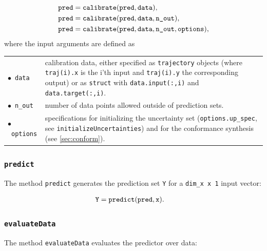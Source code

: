 \begin{equation*}
	\begin{split}
		&\texttt{pred} = {\normalfont \texttt{calibrate}}(\texttt{pred},\texttt{data}), \\
		&\texttt{pred} = {\normalfont \texttt{calibrate}}(\texttt{pred},\texttt{data},\texttt{n\_out}), \\
		&\texttt{pred} = {\normalfont \texttt{calibrate}}(\texttt{pred},\texttt{data},\texttt{n\_out},\texttt{options}), 
	\end{split}
\end{equation*}
where the input arguments are defined as
\begin{center}
	\renewcommand{\arraystretch}{1.3}
	\begin{tabular}[t]{l p{13cm} }
		$\bullet$~\texttt{data} & calibration data, either specified as \texttt{trajectory} objects (where \texttt{traj(i).x} is the i'th input and \texttt{traj(i).y} the corresponding output) or as \texttt{struct} with \texttt{data.input(:,i)} and \texttt{data.target(:,i)}.\\
		$\bullet$~\texttt{n\_out} & number of data points allowed outside of prediction sets.\\
		$\bullet$~\texttt{options} & specifications for initializing the uncertainty set (\texttt{options.up\_spec}, see \texttt{initializeUncertainties}) and for the conformance synthesis (see \cref{sec:conform}).\\
	\end{tabular}
\end{center}


\subsubsection{\texttt{predict}}

The method \texttt{predict} generates the prediction set \texttt{Y} for a \texttt{dim\_x x 1} input vector:

\begin{equation*}
	\begin{split}
		&\texttt{Y} = {\normalfont \texttt{predict}}(\texttt{pred},\texttt{x}).
	\end{split}
\end{equation*}


\subsubsection{\texttt{evaluateData}}

The method \texttt{evaluateData} evaluates the predictor over data:

